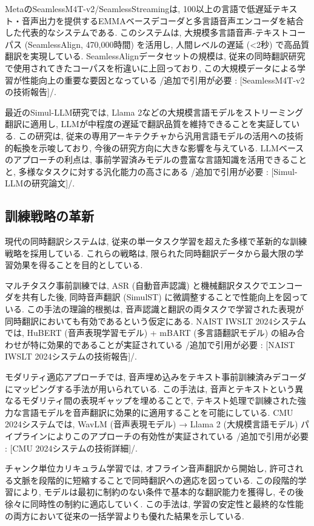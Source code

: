 MetaのSeamlessM4T-v2/SeamlessStreamingは, 100以上の言語で低遅延テキスト・音声出力を提供するEMMAベースデコーダと多言語音声エンコーダを結合した代表的なシステムである.
このシステムは, 大規模多言語音声-テキストコーパス (SeamlessAlign, 470,000時間) を活用し, 人間レベルの遅延 (<2秒) で高品質翻訳を実現している.
SeamlessAlignデータセットの規模は, 従来の同時翻訳研究で使用されてきたコーパスを桁違いに上回っており, この大規模データによる学習が性能向上の重要な要因となっている {/追加で引用が必要 : [SeamlessM4T-v2の技術報告]/}.

最近のSimul-LLM研究では, Llama 2などの大規模言語モデルをストリーミング翻訳に適用し, LLMが中程度の遅延で翻訳品質を維持できることを実証している.
この研究は, 従来の専用アーキテクチャから汎用言語モデルの活用への技術的転換を示唆しており, 今後の研究方向に大きな影響を与えている.
LLMベースのアプローチの利点は, 事前学習済みモデルの豊富な言語知識を活用できることと, 多様なタスクに対する汎化能力の高さにある {/追加で引用が必要 : [Simul-LLMの研究論文]/}.

\subsection{訓練戦略の革新}

現代の同時翻訳システムは, 従来の単一タスク学習を超えた多様で革新的な訓練戦略を採用している.
これらの戦略は, 限られた同時翻訳データから最大限の学習効果を得ることを目的としている.

マルチタスク事前訓練では, ASR (自動音声認識) と機械翻訳タスクでエンコーダを共有した後, 同時音声翻訳 (SimulST) に微調整することで性能向上を図っている.
この手法の理論的根拠は, 音声認識と翻訳の両タスクで学習された表現が同時翻訳においても有効であるという仮定にある.
NAIST IWSLT 2024システムでは, HuBERT (音声表現学習モデル) + mBART (多言語翻訳モデル) の組み合わせが特に効果的であることが実証されている {/追加で引用が必要 : [NAIST IWSLT 2024システムの技術報告]/}.

モダリティ適応アプローチでは, 音声埋め込みをテキスト事前訓練済みデコーダにマッピングする手法が用いられている.
この手法は, 音声とテキストという異なるモダリティ間の表現ギャップを埋めることで, テキスト処理で訓練された強力な言語モデルを音声翻訳に効果的に適用することを可能にしている.
CMU 2024システムでは, WavLM (音声表現モデル) → Llama 2 (大規模言語モデル) パイプラインによりこのアプローチの有効性が実証されている {/追加で引用が必要 : [CMU 2024システムの技術詳細]/}.

チャンク単位カリキュラム学習では, オフライン音声翻訳から開始し, 許可される文脈を段階的に短縮することで同時翻訳への適応を図っている.
この段階的学習により, モデルは最初に制約のない条件で基本的な翻訳能力を獲得し, その後徐々に同時性の制約に適応していく.
この手法は, 学習の安定性と最終的な性能の両方において従来の一括学習よりも優れた結果を示している.

